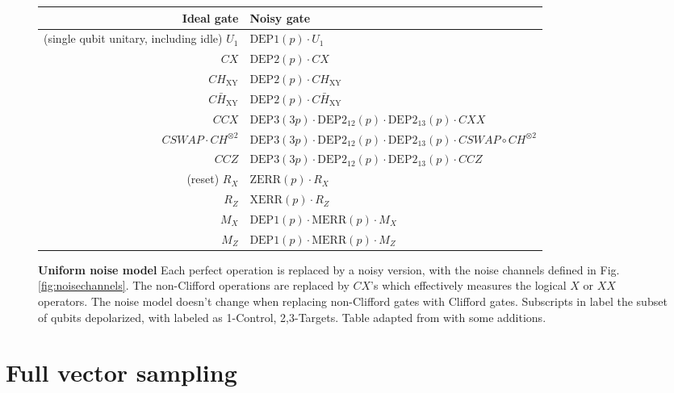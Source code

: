 \documentclass[twocolumn,notitlepage,nofootinbib,floatfix,superscriptaddress]{revtex4-1}
\begin{document}
\begin{figure}
    
    \begin{tabular}{|r|l|}
    \hline
    Ideal gate & Noisy gate
    \\
    \hline
    (single qubit unitary, including idle) $U_1$ & $\text{DEP1}(p) \cdot U_1$
    \\
    $CX$ & $\text{DEP2}(p) \cdot CX$
    \\
    $CH_{\text{XY}}$ & $\text{DEP2}(p) \cdot CH_{\text{XY}}$
    \\
    $C\bar{H}_{\text{XY}}$ & $\text{DEP2}(p) \cdot C\bar{H}_{\text{XY}}$
    \\
    $CCX$ & $\text{DEP3}(3p)\cdot\text{DEP2}_{12}(p)\cdot\text{DEP2}_{13}(p) \cdot CXX$\\
    $CSWAP\cdot CH^{\otimes2}$ & $\text{DEP3}(3p)\cdot\text{DEP2}_{12}(p)\cdot\text{DEP2}_{13}(p) \cdot CSWAP\circ CH^{\otimes2}$\\
    $CCZ$ & $\text{DEP3}(3p)\cdot\text{DEP2}_{12}(p)\cdot\text{DEP2}_{13}(p) \cdot CCZ$\\
    
    
    \hline
    (reset) $R_X$ & $\text{ZERR}(p) \cdot R_X$
    \\
    $R_Z$ & $\text{XERR}(p) \cdot R_Z$
    \\
    $M_X$ & $\text{DEP1}(p) \cdot \text{MERR}(p) \cdot M_X$
    \\
    $M_Z$ & $\text{DEP1}(p) \cdot \text{MERR}(p) \cdot M_Z$
    \\
    \hline
    \end{tabular}
    
    \caption{ \textbf{Uniform noise model} \label{fig:uniform_noise_model}  Each perfect operation is replaced by a noisy version, with the noise channels defined in Fig. \ref{fig:noisechannels}. The non-Clifford operations are replaced by $CX$'s which effectively measures the logical $X$ or $XX$ operators. The noise model doesn't change when replacing non-Clifford gates with Clifford gates.
    Subscripts in label the subset of qubits depolarized, with labeled as 1-Control, 2,3-Targets. Table adapted from \cite{gidney2024magic} with some additions.}
    
\end{figure}

\section{Full vector sampling}
\label{SI:full_vector_simulation}
\end{document}
